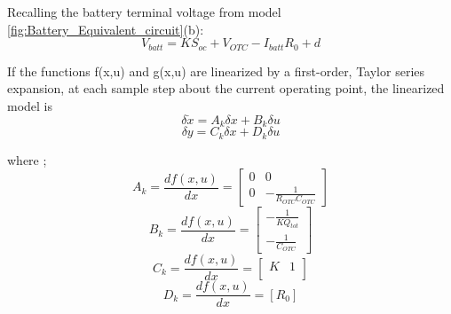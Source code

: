 Recalling the battery terminal voltage from model \ref{fig:Battery_Equivalent_circuit}(b):
\begin{equation}\label{eq:Batt_Kalaman_Terminal_Voltage}
    V_{batt} = K S_{oc} + V_{OTC} - I_{batt} R_0 + d
\end{equation}

If the functions f(x,u) and g(x,u) are linearized by a first-order, Taylor 
series expansion, at each sample step about the current operating point, 
the linearized model is 
\begin{equation}\label{eq:Batt_Kalman_State_function_tylor_expansion}
    \delta \dot{x} = A_k \delta x + B_k \delta u
\end{equation}
\begin{equation}\label{eq:Batt_Kalaman_output_function_tylor_expansion}
    \delta y = C_k \delta x + D_k \delta u
\end{equation}

where ;
\begin{equation}\label{eq:Batt_Kalman_function_tylor_expansion_Ak}
    A_k = \frac{d f(x,u)}{d x} =  \begin{bmatrix}
                                        0 & 0 \\
                                        0 & -\frac{1}{R_{OTC} C_{OTC}} 
                                  \end{bmatrix}                          
\end{equation}
\begin{equation}\label{eq:Batt_Kalman_function_tylor_expansion_Bk}
    B_k = \frac{d f(x,u)}{d x} =  \begin{bmatrix}
                                        -\frac{1}{K Q_{tot}} \\
                                         -\frac{1}{ C_{OTC}} 
                                  \end{bmatrix}                          
\end{equation}
\begin{equation}\label{eq:Batt_Kalman_function_tylor_expansion_Ck}
    C_k = \frac{d f(x,u)}{d x} =  \begin{bmatrix}
                                    K & 1\\  
                                  \end{bmatrix}                          
\end{equation}
\begin{equation}\label{eq:Batt_Kalman_function_tylor_expansion_Dk}
    D_k = \frac{d f(x,u)}{d x} =  [R_0]                         
\end{equation}

